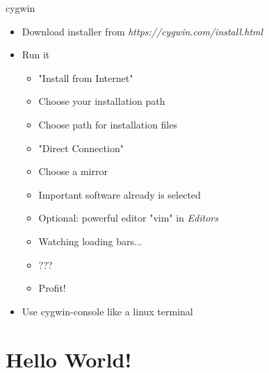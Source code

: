 \begin{frame}{cygwin}
	\begin{itemize}
		\item Download installer from \textit{https://cygwin.com/install.html}
		\item Run it
		\begin{itemize}
			\item "Install from Internet"
			\item Choose your installation path
			\item Choose path for installation files
			\item "Direct Connection"
			\item Choose a mirror
			\item Important software already is selected
			\item Optional: powerful editor "vim" in \textit{Editors}
			\item Watching loading bars...
			\item ???
			\item Profit!
		\end{itemize}
		\item Use cygwin-console like a linux terminal
	\end{itemize}
\end{frame}
\section{Hello World!}
